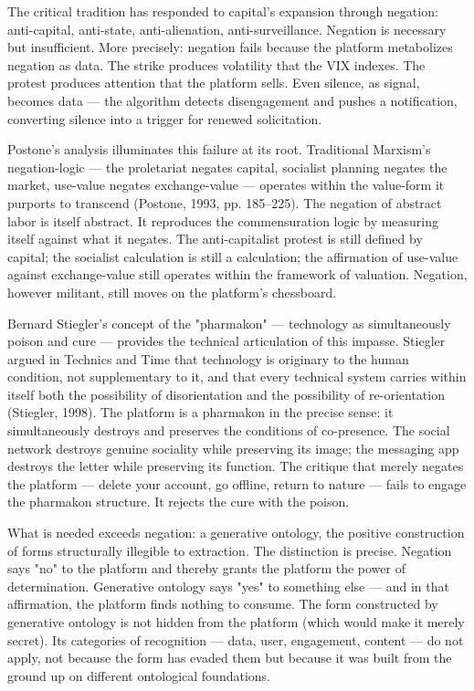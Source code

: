 The critical tradition has responded to capital's expansion through negation: anti-capital, anti-state, anti-alienation, anti-surveillance. Negation is necessary but insufficient. More precisely: negation fails because the platform metabolizes negation as data. The strike produces volatility that the VIX indexes. The protest produces attention that the platform sells. Even silence, as signal, becomes data — the algorithm detects disengagement and pushes a notification, converting silence into a trigger for renewed solicitation.

Postone's analysis illuminates this failure at its root. Traditional Marxism's negation-logic — the proletariat negates capital, socialist planning negates the market, use-value negates exchange-value — operates within the value-form it purports to transcend (Postone, 1993, pp. 185–225). The negation of abstract labor is itself abstract. It reproduces the commensuration logic by measuring itself against what it negates. The anti-capitalist protest is still defined by capital; the socialist calculation is still a calculation; the affirmation of use-value against exchange-value still operates within the framework of valuation. Negation, however militant, still moves on the platform's chessboard.

Bernard Stiegler's concept of the "pharmakon" — technology as simultaneously poison and cure — provides the technical articulation of this impasse. Stiegler argued in Technics and Time that technology is originary to the human condition, not supplementary to it, and that every technical system carries within itself both the possibility of disorientation and the possibility of re-orientation (Stiegler, 1998). The platform is a pharmakon in the precise sense: it simultaneously destroys and preserves the conditions of co-presence. The social network destroys genuine sociality while preserving its image; the messaging app destroys the letter while preserving its function. The critique that merely negates the platform — delete your account, go offline, return to nature — fails to engage the pharmakon structure. It rejects the cure with the poison.

What is needed exceeds negation: a generative ontology, the positive construction of forms structurally illegible to extraction. The distinction is precise. Negation says "no" to the platform and thereby grants the platform the power of determination. Generative ontology says "yes" to something else — and in that affirmation, the platform finds nothing to consume. The form constructed by generative ontology is not hidden from the platform (which would make it merely secret). Its categories of recognition — data, user, engagement, content — do not apply, not because the form has evaded them but because it was built from the ground up on different ontological foundations.

